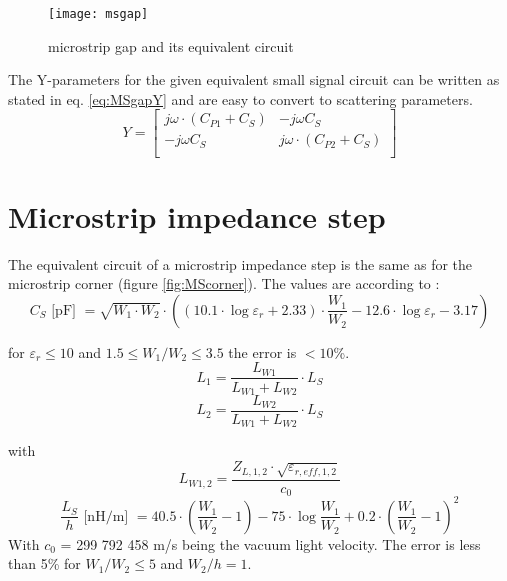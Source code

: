 \begin{figure}[ht]
\begin{center}
\texttt{[image: msgap]}
\end{center}
\caption{microstrip gap and its equivalent circuit}
\label{fig:MSgap}
\end{figure}
\FloatBarrier

The Y-parameters for the given equivalent small signal circuit can be
written as stated in eq. \eqref{eq:MSgapY} and are easy to convert to
scattering parameters.
\begin{equation}
Y =
\begin{bmatrix}
j\omega\cdot \left(C_{P1} + C_S\right) & -j\omega C_S\\
-j\omega C_S & j\omega\cdot \left(C_{P2} + C_S\right)\\
\end{bmatrix}
\label{eq:MSgapY}
\end{equation}

\section{Microstrip impedance step}

The equivalent circuit of a microstrip impedance step is the same as
for the microstrip corner (figure \ref{fig:MScorner}).  The values are
according to \cite{Gupta}:
\begin{equation}
C_S \textrm{ [pF] } = \sqrt{W_1\cdot W_2}\cdot\left( (10.1\cdot\log{\varepsilon_r} + 2.33)\cdot
     \dfrac{W_1}{W_2} - 12.6\cdot\log{\varepsilon_r} - 3.17 \right)
\end{equation}

for $\varepsilon_r\le 10$ and $1.5\le W_1/W_2\le 3.5$ the error is
$<10$\%.
\begin{equation}
L_1 = \frac{L_{W1}}{L_{W1}+L_{W2}}\cdot L_S
\end{equation}
\begin{equation}
L_2 = \frac{L_{W2}}{L_{W1}+L_{W2}}\cdot L_S
\end{equation}

with
\begin{equation}
L_{W1,2} = \dfrac{Z_{L,1,2}\cdot\sqrt{\varepsilon_{r,eff,1,2}}}{c_0}
\end{equation}
\begin{equation}
\frac{L_S}{h} \textrm{ [nH/m] } = 40.5\cdot\left( \dfrac{W_1}{W_2}-1 \right)
      - 75\cdot\log{\dfrac{W_1}{W_2}} + 0.2\cdot \left( \dfrac{W_1}{W_2}-1 \right)^2
\end{equation}
With $c_0$ = 299 792 458 m/s being the vacuum light velocity.  The
error is less than 5\% for $W_1/W_2\le 5$ and $W_2/h = 1$.

